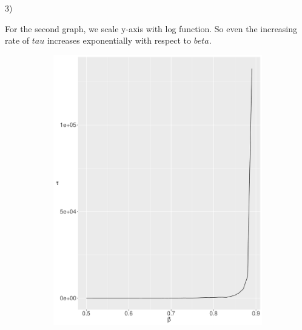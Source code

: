 \documentclass[12pt, oneside]{article}   	%
\begin{document}
3)\par
For the second graph, we scale y-axis with log function.  So even the increasing rate of $tau$ increases exponentially with respect to $beta$.   
\begin{figure}[H]
        \centering
        \begin{subfigure}[b]{0.475\textwidth}
            \centering
            \includegraphics[width=\textwidth, height=0.5\textheight]{1.pdf}
        \end{subfigure}
        \quad
        \begin{subfigure}[b]{0.475\textwidth}
            \centering

\end{subfigure}
\end{figure}
\end{document}
